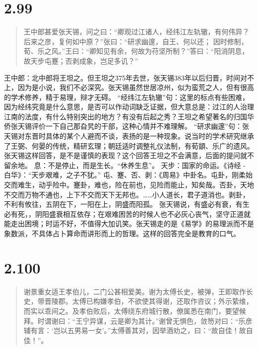 \documentclass[]{book}
\begin{document}
\section{2.99}\label{section-145}

\begin{quote}
王中郎甚爱张天锡，问之曰：``卿观过江诸人，经纬江左轨辙，有何伟异？后来之彦，复何如中原？''张曰：``研求幽邃，自王、何以还；
因时修制，荀、乐之风。''王曰：``卿知见有余，何故为苻坚所制？''答曰：``阳消阴息，故天步屯蹇；否剥成象，岂足多讥？''
\end{quote}

王中郎：北中郎将王坦之。但王坦之375年去世，张天锡383年以后归晋，时间对不上，因为是小说，我们不必深究。张天锡虽然世居凉州，似为蛮荒之人，但有很高的学术修养，精于易理，辩才无碍。
``经纬江左轨辙''句：这里的标点有些困难，因为经纬究竟是什么意思，是否可以作动词缺乏证据，但大意总是：过江的人治理江南的法度，有什么特别突出的地方？有没有后起之秀？王坦之希望著名的归国华侨张天锡评价一下自己那旮旯的干部，这种心情并不难理解。
``研求幽邃''句：张天锡对东晋时具体的某个人避而不谈，表扬的是一种现象。说当时的学术研究继承了王弼、何晏的传统，精研玄理；朝廷适时调整礼仪法制，有荀顗、乐广的遗风。张天锡这样回答，是不是谨慎的表现？这个回答王坦之不会满意，后面的提问就不留余地。
息：不是停止，而是生长。``休养生息''。 天步：国家的命运。《诗经 -
白华》：``天步艰难，之子不犹。''
屯、蹇、否、剥：《周易》中卦名。屯卦，刚柔始交而难生，动乎险中。蹇卦，难也，险在前也，见险而能止，知矣哉。否卦，天地不交而万物不通也，上下不交而天下无邦也。\ldots{}\ldots{}小人道长，君子道消也。剥卦，不利有攸往，五阴在下，一阳在上，阴盛而阳孤。
张天锡说，有盛必有衰，有生必有死，，阴阳盛衰相互依存；在艰难困苦的时候人也不必灰心丧气，坚守正道就能走出困境；时运不好，不值得大加讥笑。张天锡走的是《易学》的易理派而不是象数派，不具体占卜算命而讲形而上的哲理。这样的回答完全是教育的口气。

\section{2.100}\label{section-146}

\begin{quote}
谢景重女适王孝伯儿，二门公甚相爱美。谢为太傅长史，被弹，王即取作长史，带晋陵郡。太傅已构嫌孝伯，不欲使其得谢，还取作咨议；外示絷维，而实以乖间之。及孝伯败后，太傅绕东府城行散，僚属悉在南门，要望候拜。时谓谢曰：``王宁异谋，云是卿为其计。''谢曾无惧色，敛笏对曰：``乐彦辅有言：`岂以五男易一女'。''太傅善其对，因举酒劝之，曰：``故自佳！故自佳！''。
\end{quote}
\end{document}
